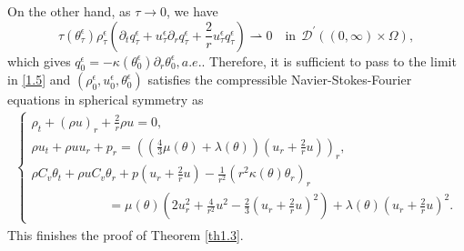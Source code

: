 \documentclass[11pt,reqno]{amsart}
\numberwithin{equation}{section}
\begin{document}
 On the other hand, as $\tau \rightarrow 0$, we have
\[
\tau(\theta_\tau^\epsilon) \rho_\tau^\epsilon  (\partial_t q_\tau^\epsilon+u_\tau^\epsilon \partial_r q_\tau^\epsilon+\frac{2}{r} u_\tau^\epsilon q_\tau^\epsilon) \rightharpoonup 0\quad \mathrm{in} \,\; \mathcal {D}^\prime((0,\infty)\times \Omega),
\]
which gives $q_0^\epsilon=-\kappa(\theta_0^\epsilon) \partial_r\theta_0^\epsilon, a.e.$.
Therefore, it is sufficient to pass to the limit in \eqref{1.5} and $(\rho_0^\epsilon, u_0^\epsilon, \theta_0^\epsilon) $ satisfies the  compressible Navier-Stokes-Fourier equations in spherical symmetry as
\begin{align}\label{4.5}
\begin{cases}
	\rho_t+(\rho u)_r+\frac{2}{r} \rho u = 0, \\
	\rho u_t+\rho u u_r+ p_r = \left( \left(\frac{4}{3} \mu(\theta)+\lambda(\theta)\right)\left(u_{r}+\frac{2}{r}u \right)\right)_r ,\\
	\rho C_v \theta_t + \rho u C_v \theta_r + p\left(u_r+\frac{2}{r} u\right) -\frac{1}{r^2} (r^2 \kappa(\theta) \theta_r)_r \\
	\qquad\qquad\qquad= \mu(\theta)\left( 2u_r^2+\frac{4}{r^2}u^2 - \frac{2}{3} \left(u_r+\frac{2}{r} u\right)^2\right) + \lambda(\theta)\left(u_r+\frac{2}{r} u\right)^2.
 \end{cases}
\end{align}
This finishes the proof of Theorem \ref{th1.3}.
\end{document}
